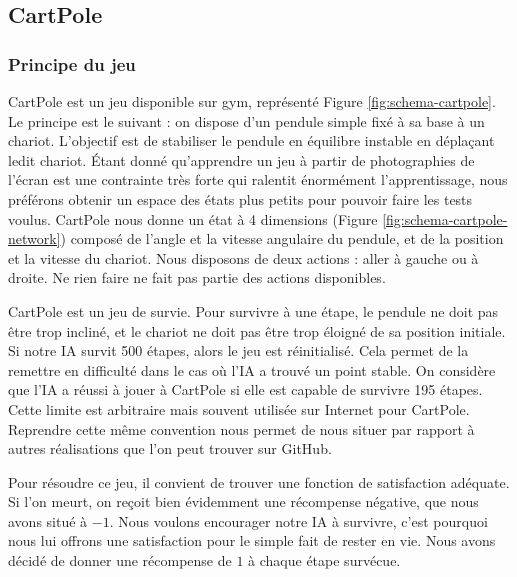 \subsection{CartPole}

\subsubsection{Principe du jeu}

CartPole est un jeu disponible sur gym, représenté Figure \ref{fig:schema-cartpole}. Le principe est le suivant : on dispose d'un pendule simple fixé à sa base à un chariot. L'objectif est de stabiliser
le pendule en équilibre instable en déplaçant ledit chariot. Étant donné qu'apprendre un jeu à partir de photographies de l'écran est une contrainte très forte 
qui ralentit énormément l'apprentissage, nous préférons obtenir un espace des états plus petits pour pouvoir faire les tests voulus. CartPole nous donne un 
état à 4 dimensions (Figure \ref{fig:schema-cartpole-network}) composé de l'angle et la vitesse angulaire du pendule, et de la position et la vitesse du chariot.
Nous disposons de deux actions : aller à gauche ou à droite. Ne rien faire ne fait pas partie des actions disponibles.

CartPole est un jeu de survie. Pour survivre à une étape, le pendule ne doit pas être trop incliné, et le chariot ne doit pas être trop éloigné de sa position
initiale. Si notre IA survit 500 étapes, alors le jeu est réinitialisé. Cela permet de la remettre en difficulté dans le cas où l'IA a trouvé un
point stable. On considère que l'IA a réussi à jouer à CartPole si elle est capable de survivre 195 étapes. Cette limite est arbitraire mais souvent utilisée sur
Internet pour CartPole. Reprendre cette même convention nous permet de nous situer par rapport à autres réalisations que l'on peut trouver sur GitHub.

Pour résoudre ce jeu, il convient de trouver une fonction de satisfaction adéquate. Si l'on meurt, on reçoit bien évidemment une récompense négative, que nous
avons situé à $-1$. Nous voulons encourager notre IA à survivre, c'est pourquoi nous lui offrons une satisfaction pour le simple fait de rester en vie. Nous avons
décidé de donner une récompense de $1$ à chaque étape survécue.


